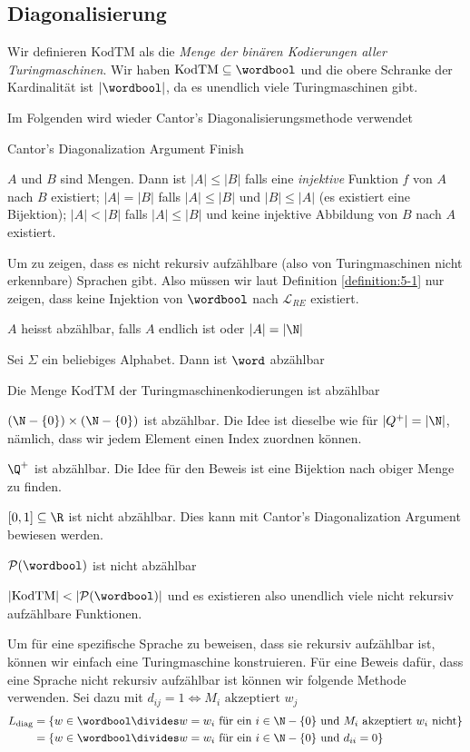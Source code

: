 \subsection{Diagonalisierung}
Wir definieren $\text{KodTM}$ als die \textit{Menge der binären Kodierungen aller Turingmaschinen}.
Wir haben $\text{KodTM} \subseteq \wordbool$ und die obere Schranke der Kardinalität ist $|\wordbool|$, da es unendlich viele Turingmaschinen gibt.

Im Folgenden wird wieder Cantor's Diagonalisierungsmethode verwendet
\begin{recall}[]{Cantor's Diagonalization Argument}
    \TODO Finish
\end{recall}

\inlinedef $A$ und $B$ sind Mengen. Dann ist $|A| \leq |B|$ falls eine \textit{injektive} Funktion $f$ von $A$ nach $B$ existiert;
$|A| = |B|$ falls $|A| \leq |B|$ und $|B| \leq |A|$ (es existiert eine Bijektion);
$|A| < |B|$ falls $|A| \leq |B|$ und keine injektive Abbildung von $B$ nach $A$ existiert.

Um zu zeigen, dass es nicht rekursiv aufzählbare (also von Turingmaschinen nicht erkennbare) Sprachen gibt.
Also müssen wir laut Definition \ref{definition:5-1} nur zeigen, dass keine Injektion von $\wordbool$ nach $\mathcal{L}_{RE}$ existiert.

 $A$ heisst abzählbar, falls $A$ endlich ist oder $|A| = |\N|$

\inlinelemma Sei $\Sigma$ ein beliebiges Alphabet. Dann ist $\word$ abzählbar

\inlinetheorem Die Menge $\text{KodTM}$ der Turingmaschinenkodierungen ist abzählbar

\inlinelemma $(\N - \{ 0 \}) \times (\N - \{ 0 \})$ ist abzählbar. Die Idee ist dieselbe wie für $|Q^+| = |\N|$, nämlich, dass wir jedem Element einen Index zuordnen können.

\inlinetheorem $\Q^+$ ist abzählbar. Die Idee für den Beweis ist eine Bijektion nach obiger Menge zu finden.

\inlinetheorem $[0, 1] \subseteq \R$ ist nicht abzählbar. Dies kann mit Cantor's Diagonalization Argument bewiesen werden.

\inlinetheorem $\mathcal{P}(\wordbool)$ ist nicht abzählbar

\inlinecorollary $|\text{KodTM}| < |\mathcal{P}(\wordbool)|$ und es existieren also unendlich viele nicht rekursiv aufzählbare Funktionen.

Um für eine spezifische Sprache zu beweisen, dass sie rekursiv aufzählbar ist, können wir einfach eine Turingmaschine konstruieren.
Für eine Beweis dafür, dass eine Sprache nicht rekursiv aufzählbar ist können wir folgende Methode verwenden. Sei dazu mit $d_{ij} = 1 \Longleftrightarrow M_i \text{ akzeptiert } w_j$
\begin{align*}
    L_{\text{diag}} & = \{ w \in \wordbool \divides w = w_i \text{ für ein } i \in \N - \{ 0 \} \text{ und } M_i \text{ akzeptiert } w_i \text{ nicht} \} \\
                    & = \{ w \in \wordbool \divides w = w_i \text{ für ein } i \in \N - \{ 0 \} \text{ und } d_{ii} = 0 \}
\end{align*}

